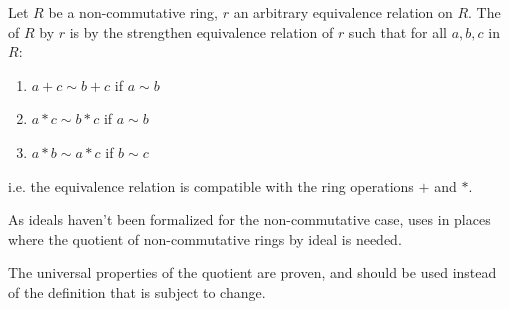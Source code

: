 \begin{definition}
    \label{RingQuot}
    \leanok

    Let $R$ be a non-commutative ring, $r$ an arbitrary equivalence relation on $R$.
    The  of $R$ by $r$
    is by the strengthen equivalence relation of $r$ such that for all $a, b, c$ in $R$:

    \begin{enumerate}

    \item $a + c \sim b + c$ if $a \sim b$
    \item $a * c \sim b * c$ if $a \sim b$
    \item $a * b \sim a * c$ if $b \sim c$
    
    \end{enumerate}

    i.e. the equivalence relation is compatible with the ring operations $+$ and $*$.

\end{definition}

\begin{remark}
    \label{mk:RingQuot}

    As ideals haven't been formalized for the non-commutative case, \Mathlib uses  in places
    where the quotient of non-commutative rings by ideal is needed.

    The universal properties of the quotient are proven, and should be used instead of the definition that is subject to change.
    
\end{remark}

